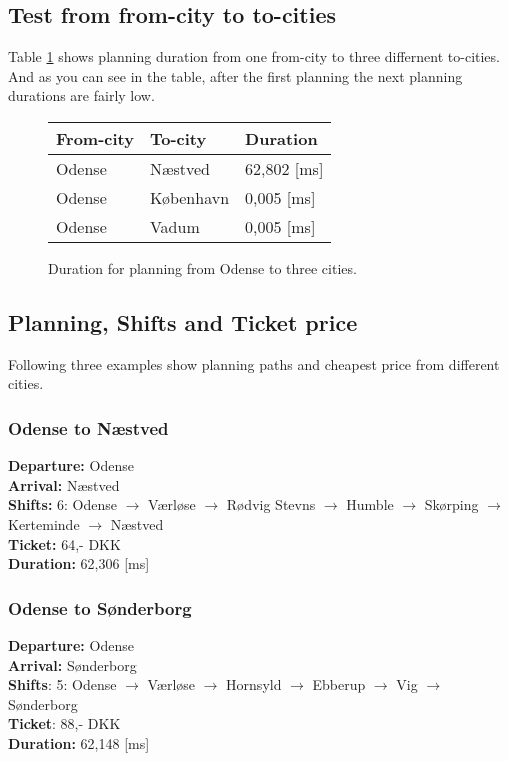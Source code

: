 \subsection{Test from from-city to to-cities}
Table \ref{tb:fromonetocities} shows planning duration from one from-city to three differnent to-cities. And as you can see in the table, after the first planning the next planning durations are fairly low.
\begin{figure}[th!]
\centering
\begin{tabular}{l|l|l}
From-city & To-city & Duration \\\hline
Odense & Næstved & 62,802 [ms] \\
Odense & København & 0,005 [ms] \\
Odense & Vadum & 0,005 [ms]  
\end{tabular}
\captionsetup{type=table}
\caption[tekst i indholdsfortegnelsen]{Duration for planning from Odense to three cities.}
\label{tb:fromonetocities}
\end{figure}


\subsection{Planning, Shifts and Ticket price}
Following three examples show planning paths and cheapest price from different cities.

\subsubsection{Odense to Næstved}
\textbf{Departure:} Odense \\
\textbf{Arrival:}   Næstved \\
\textbf{Shifts:}    6: Odense $\rightarrow$ Værløse $\rightarrow$ Rødvig Stevns $\rightarrow$ Humble $\rightarrow$ Skørping $\rightarrow$ Kerteminde $\rightarrow$ Næstved\\
\textbf{Ticket:}    64,- DKK \\
\textbf{Duration:}  62,306 [ms] 
\subsubsection{Odense to Sønderborg}
\textbf{Departure:} Odense \\
\textbf{Arrival: }  Sønderborg \\ 
\textbf{Shifts}:    5: Odense $\rightarrow$ Værløse $\rightarrow$ Hornsyld $\rightarrow$ Ebberup $\rightarrow$ Vig $\rightarrow$ Sønderborg \\
\textbf{Ticket}:    88,- DKK \\
\textbf{Duration:}  62,148 [ms]
